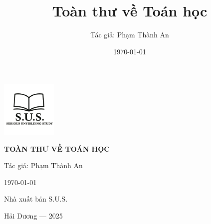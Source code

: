 \documentclass[12pt,a4paper,twoside]{book} %
\title{Toàn thư về Toán học}
\author{Tác giả: Phạm Thành An}
\date{\today}
\begin{document}
\frontmatter

\begin{titlepage}
    \centering
    \vspace*{1cm}
    
    \includegraphics[width=0.2\textwidth]{images/logo.png}
    
    \vfill
    
    \parbox{0.8\textwidth}{
        \centering
        \sffamily %
        {\Huge\bfseries TOÀN THƯ VỀ TOÁN HỌC\par}
        \vspace{2cm}
        {\Large Tác giả: Phạm Thành An\par}
        \vspace{1.5cm}
        {\large \today\par}
    }
    
    \vfill
    \vfill
    
    {\sffamily Nhà xuất bản S.U.S.\par}
    {\sffamily Hải Dương --- 2025\par}
\end{titlepage}

\tableofcontents




\mainmatter

% 

\backmatter
% 
% 
\end{document}
